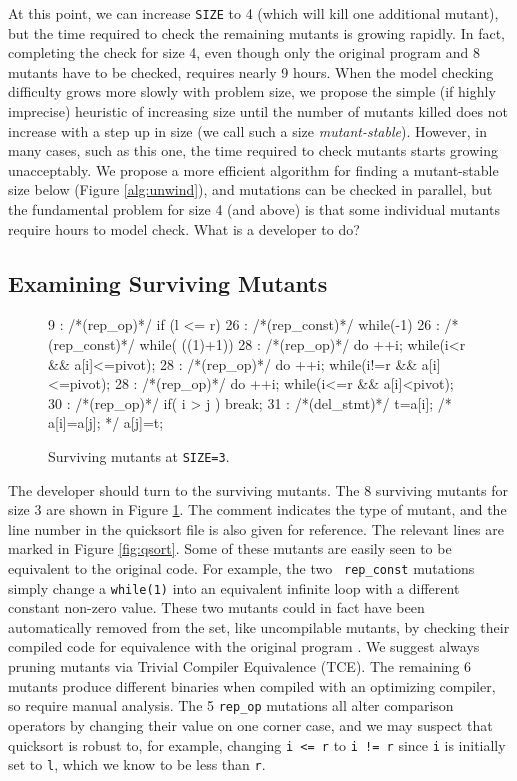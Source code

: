 \documentclass{svjour3}
\begin{document}
At this point, we can increase {\tt SIZE} to 4 (which will kill one
additional mutant), but the time required to check the remaining
mutants is growing rapidly.  In fact, completing the check for size 4,
even though only the original program and 8 mutants have to be
checked, requires nearly 9 hours.  When the model checking
difficulty grows more slowly with problem size, we propose the simple
(if highly imprecise)
heuristic of increasing
size until the number of mutants killed does not increase with a step
up in size (we call such a size
\emph{mutant-stable}).  However, in
many cases, such as this one, the time required to check mutants
starts growing unacceptably.  We propose a more efficient algorithm
for finding a mutant-stable size below (Figure \ref{alg:unwind}), and
mutations can be checked in parallel, but the fundamental problem for
size 4 (and above) is that some individual mutants require hours to
model check.  What is a developer to do?


\subsection{Examining Surviving Mutants}
\label{sec:maxcover}


\begin{figure}
{%
\begin{code}
 9 :   /*(rep\_op)*/ if (l <= r) 
 26 :  /*(rep\_const)*/ while(-1)
 26 :  /*(rep\_const)*/ while( ((1)+1))
 28 :  /*(rep\_op)*/ do ++i; while(i<r \&\& a[i]<=pivot);
 28 :  /*(rep\_op)*/ do ++i; while(i!=r \&\& a[i]<=pivot);
 28 :  /*(rep\_op)*/ do ++i; while(i<=r \&\& a[i]<pivot);
 30 :  /*(rep\_op)*/ if( i > j ) break;
 31 :  /*(del\_stmt)*/ t=a[i]; /*  a[i]=a[j]; */  a[j]=t;
\end{code}
}
\caption{Surviving mutants at {\tt SIZE=3}.}
\label{fig:survivors}
\end{figure}

The developer should turn to the surviving mutants.  The 8 surviving  
mutants for size 3 are shown in Figure \ref{fig:survivors}.  
The comment indicates the type of mutant, and the line number in the quicksort file is also given for reference.  The relevant lines are marked
in Figure \ref{fig:qsort}.  Some of these mutants are easily seen to
be equivalent to the original code.  For example, the two {\tt
  rep\_const} mutations simply change a {\tt while(1)} into an
equivalent infinite loop with a different constant non-zero value.
These two mutants could in fact have been automatically removed from
the set, like uncompilable mutants, by checking their compiled code
for equivalence with the original program \cite{TCE}.  We suggest
always pruning mutants via Trivial Compiler Equivalence (TCE).  The remaining 6 mutants produce different
binaries when compiled with an optimizing compiler, so require manual
analysis.  The 5 {\tt rep\_op} mutations all alter comparison
operators by changing their value on one corner case, and we may suspect that quicksort is robust to,
for example, changing {\tt i <= r} to {\tt i != r} since {\tt i} is
initially set to {\tt l}, which we know to be less than {\tt r}.
\end{document}

